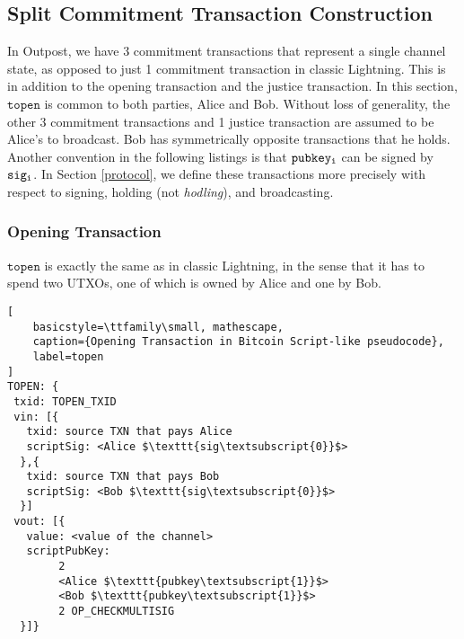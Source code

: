 \subsection{Split Commitment Transaction Construction}
In Outpost, we have 3 commitment transactions that represent a single channel state, as opposed to just 1 commitment transaction in classic Lightning. This is in addition to the opening transaction and the justice transaction. In this section, $\texttt{topen}$ is common to both parties, Alice and Bob. Without loss of generality, the other 3 commitment transactions and 1 justice transaction are assumed to be Alice's to broadcast. Bob has symmetrically opposite transactions that he holds. Another convention in the following listings is that $\texttt{pubkey\textsubscript{i}}$ can be signed by $\texttt{sig\textsubscript{i}}$. In Section \ref{protocol}, we define these transactions more precisely with respect to signing, holding (not \textit{hodling}), and broadcasting.
\subsubsection{Opening Transaction}
$\texttt{topen}$ is exactly the same as in classic Lightning, in the sense that it has to spend two UTXOs, one of which is owned by Alice and one by Bob. 

\begin{lstlisting}[
    basicstyle=\ttfamily\small, mathescape,
    caption={Opening Transaction in Bitcoin Script-like pseudocode},
    label=topen
]
TOPEN: {
 txid: TOPEN_TXID
 vin: [{
   txid: source TXN that pays Alice
   scriptSig: <Alice $\texttt{sig\textsubscript{0}}$>
  },{     
   txid: source TXN that pays Bob
   scriptSig: <Bob $\texttt{sig\textsubscript{0}}$>
  }]      
 vout: [{
   value: <value of the channel>
   scriptPubKey: 
        2 
        <Alice $\texttt{pubkey\textsubscript{1}}$> 
        <Bob $\texttt{pubkey\textsubscript{1}}$> 
        2 OP_CHECKMULTISIG
  }]}
\end{lstlisting}

